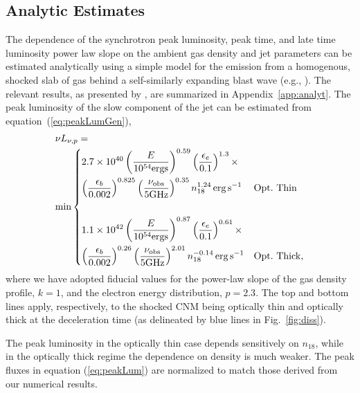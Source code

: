 \documentclass[usenatbib,fleqn]{mnras}
\begin{document}
\subsection{Analytic Estimates}
\label{sec:analyt}
The dependence of the synchrotron peak luminosity, peak time, and late
time luminosity power law slope on the ambient gas density and jet
parameters can be estimated analytically using a simple model for the
emission from a homogenous, shocked slab of gas behind a
self-similarly expanding blast wave (e.g., \citealt{Sari+98,
  Granot+02}).  The relevant results, as presented by
\citet{Leventis+2012}, are summarized in Appendix~\ref{app:analyt}.
The peak luminosity of the slow component of the jet can be estimated
from equation~(\ref{eq:peakLumGen}),
\begin{align}
&\nu L_{\nu, p}=\nonumber\\ &\text{min}
\begin{dcases}
  2.7\times 10^{40} \left(\frac{E}{10^{54} {\rm ergs}}\right)^{0.59}
  \left(\frac{\epsilon_e}{0.1}\right)^{1.3}\times \\
  \left(\frac{\epsilon_b}{0.002}\right)^{0.825}\left(\frac{\nu_{\rm
        obs}}{5 {\rm GHz}}\right)^{0.35}  n_{18}^{1.24}
  \,{\rm erg \, s^{-1}} & {\rm Opt.~Thin}\\\\
  1.1 \times 10^{42} \left(\frac{E}{10^{54} {\rm ergs}}\right)^{0.87}
  \left(\frac{\epsilon_e}{0.1}\right)^{0.61}\times\\
  \left(\frac{\epsilon_b}{0.002}\right)^{0.26}\left(\frac{\nu_{\rm
        obs}}{5 {\rm GHz}}\right)^{2.01}  n_{18}^{-0.14} \,{\rm erg\,
    s^{-1}} & {\rm Opt.~Thick},
\end{dcases}
\label{eq:peakLum}
\end{align}
where we have adopted fiducial values for the power-law slope of the
gas density profile, $k=1$, and the electron energy distribution,
$p=2.3$.  The top and bottom lines apply, respectively, to the shocked
CNM being optically thin and optically thick at the deceleration time (as delineated by blue lines in Fig.~\ref{fig:diss}).

The peak luminosity in the optically thin case depends sensitively on
$n_{18}$, while in the optically thick regime the dependence on
density is much weaker.  The peak fluxes in equation
(\ref{eq:peakLum}) are normalized to match those derived from our
numerical results.
\end{document}
